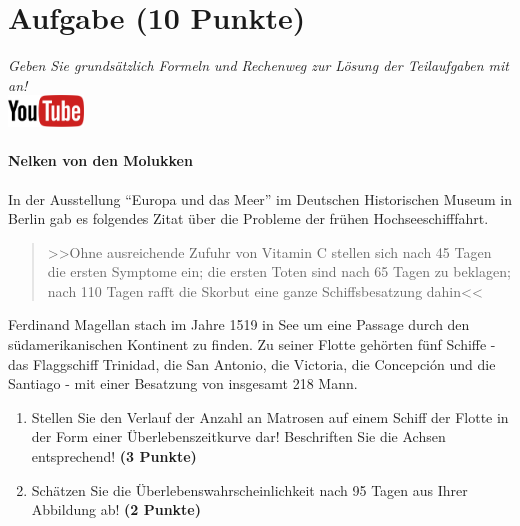 \documentclass[a4paper, 9pt]{scrartcl}\usepackage[]{graphicx}\usepackage[]{xcolor}
\begin{document}
 
\clearpage

\section{Aufgabe \hfill (10 Punkte)}

\textit{Geben Sie grunds{\"a}tzlich Formeln und Rechenweg zur L{\"o}sung der
  Teilaufgaben mit an!} \\[1Ex]

\hfill\href{https://youtu.be/1B53cVFIU7Q}{\includegraphics[width =
  2cm]{img/youtube}} %
\hspace{2Ex}

\paragraph{Nelken von den Molukken}



In der Ausstellung "`Europa und das Meer"' im Deutschen Historischen Museum in
Berlin gab es folgendes Zitat {\"u}ber die Probleme der fr{\"u}hen Hochseeschifffahrt.

\begin{quote}
  >>Ohne ausreichende Zufuhr von Vitamin C stellen sich nach 45 Tagen die
  ersten Symptome ein; die ersten Toten sind nach 65 Tagen zu beklagen;
  nach 110 Tagen rafft die Skorbut eine ganze Schiffsbesatzung dahin<<
\end{quote}

Ferdinand Magellan stach im Jahre 1519 in See um eine Passage durch den
s{\"u}damerikanischen Kontinent zu finden. Zu seiner Flotte geh{\"o}rten
f{\"u}nf Schiffe - das Flaggschiff Trinidad, die San Antonio, die Victoria, die
Concepci{\'o}n und die Santiago - mit einer Besatzung von insgesamt
218 Mann. 

\begin{enumerate}
\item Stellen Sie den Verlauf der Anzahl an Matrosen auf einem Schiff der
  Flotte in der Form einer {\"U}berlebenszeitkurve dar! Beschriften Sie die
  Achsen entsprechend! \textbf{(3 Punkte)} 
\item Sch{\"a}tzen Sie die {\"U}berlebenswahrscheinlichkeit nach 95 Tagen
  aus Ihrer Abbildung ab! \textbf{(2 Punkte)} 
\end{enumerate}
\end{document}
